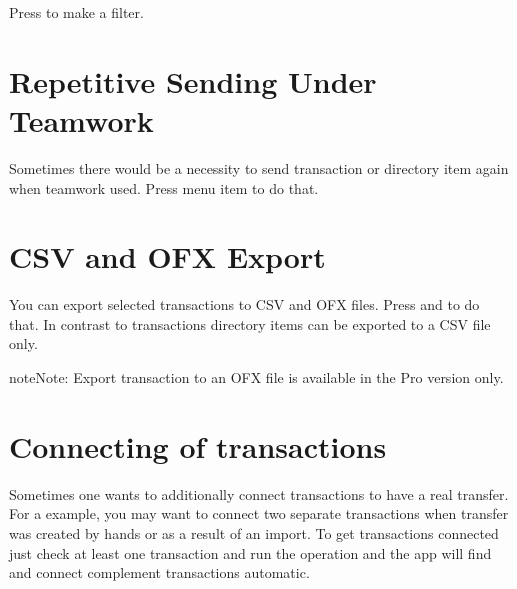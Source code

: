 \documentclass[a4paper,10pt,english]{sphinxmanual}
\begin{document}
\sphinxAtStartPar
Press  to make a filter.

\noindent{}

\noindent{}


\section{Repetitive Sending Under Teamwork}
\label{\detokenize{bulk-actions:repetitive-sending-under-teamwork}}
\sphinxAtStartPar
Sometimes there would be a necessity to send transaction or directory item again when teamwork used.
Press  menu item to do that.

\noindent{}

\noindent{}

\noindent{}


\section{CSV and OFX Export}
\label{\detokenize{bulk-actions:csv-and-ofx-export}}
\sphinxAtStartPar
You can export selected transactions to CSV and OFX files. Press 
and  to do that. In contrast to transactions directory items
can be exported to a CSV file only.

\begin{sphinxadmonition}{note}{Note:}
\sphinxAtStartPar
Export transaction to an OFX file is available in the Pro version only.
\end{sphinxadmonition}

\noindent{}

\noindent{}

\noindent{}


\section{Connecting of transactions}
\label{\detokenize{bulk-actions:connecting-of-transactions}}
\sphinxAtStartPar
Sometimes one wants to additionally connect transactions to have a real transfer. For a
example, you may want to connect two separate transactions when transfer was created by hands or
as a result of an import. To get transactions connected just check at least one transaction and
run the operation and the app will find and connect complement transactions automatic.
\end{document}

